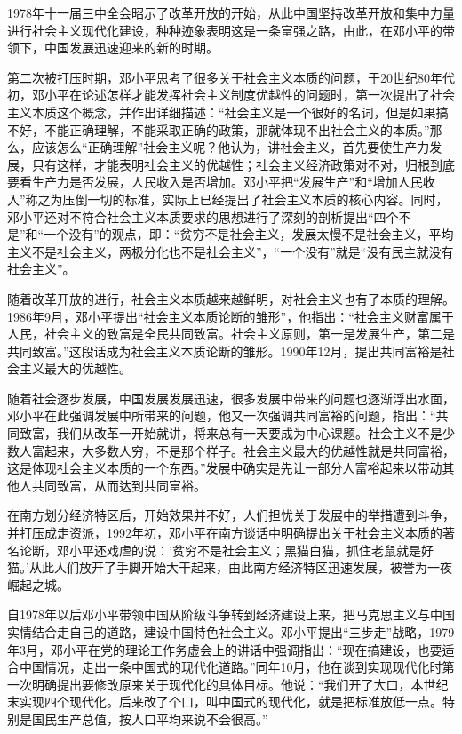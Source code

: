 \documentclass[cs4size,a4paper,nofonts]{ctexart}
\begin{document}
1978年十一届三中全会昭示了改革开放的开始，从此中国坚持改革开放和集中力量进行社会主义现代化建设，种种迹象表明这是一条富强之路，由此，在邓小平的带领下，中国发展迅速迎来的新的时期。	

第二次被打压时期，邓小平思考了很多关于社会主义本质的问题，于20世纪80年代初，邓小平在论述怎样才能发挥社会主义制度优越性的问题时，第一次提出了社会主义本质这个概念，并作出详细描述：“社会主义是一个很好的名词，但是如果搞不好，不能正确理解，不能采取正确的政策，那就体现不出社会主义的本质。”那么，应该怎么“正确理解”社会主义呢？他认为，讲社会主义，首先要使生产力发展，只有这样，才能表明社会主义的优越性；社会主义经济政策对不对，归根到底要看生产力是否发展，人民收入是否增加。邓小平把“发展生产”和“增加人民收入”称之为压倒一切的标准，实际上已经提出了社会主义本质的核心内容。同时，邓小平还对不符合社会主义本质要求的思想进行了深刻的剖析提出“四个不是”和“一个没有”的观点，即：“贫穷不是社会主义，发展太慢不是社会主义，平均主义不是社会主义，两极分化也不是社会主义”，“一个没有”就是“没有民主就没有社会主义”。

随着改革开放的进行，社会主义本质越来越鲜明，对社会主义也有了本质的理解。1986年9月，邓小平提出“社会主义本质论断的雏形”，他指出：“社会主义财富属于人民，社会主义的致富是全民共同致富。社会主义原则，第一是发展生产，第二是共同致富。”这段话成为社会主义本质论断的雏形。1990年12月，提出共同富裕是社会主义最大的优越性。

随着社会逐步发展，中国发展发展迅速，很多发展中带来的问题也逐渐浮出水面，邓小平在此强调发展中所带来的问题，他又一次强调共同富裕的问题，指出：“共同致富，我们从改革一开始就讲，将来总有一天要成为中心课题。社会主义不是少数人富起来，大多数人穷，不是那个样子。社会主义最大的优越性就是共同富裕，这是体现社会主义本质的一个东西。”发展中确实是先让一部分人富裕起来以带动其他人共同致富，从而达到共同富裕。

在南方划分经济特区后，开始效果并不好，人们担忧关于发展中的举措遭到斗争，并打压成走资派，1992年初，邓小平在南方谈话中明确提出关于社会主义本质的著名论断，邓小平还戏虐的说：’贫穷不是社会主义；黑猫白猫，抓住老鼠就是好猫。’从此人们放开了手脚开始大干起来，由此南方经济特区迅速发展，被誉为一夜崛起之城。

自1978年以后邓小平带领中国从阶级斗争转到经济建设上来，把马克思主义与中国实情结合走自己的道路，建设中国特色社会主义。邓小平提出“三步走”战略，1979年3月，邓小平在党的理论工作务虚会上的讲话中强调指出：“现在搞建设，也要适合中国情况，走出一条中国式的现代化道路。”同年10月，他在谈到实现现代化时第一次明确提出要修改原来关于现代化的具体目标。他说：“我们开了大口，本世纪末实现四个现代化。后来改了个口，叫中国式的现代化，就是把标准放低一点。特别是国民生产总值，按人口平均来说不会很高。”
\end{document}
